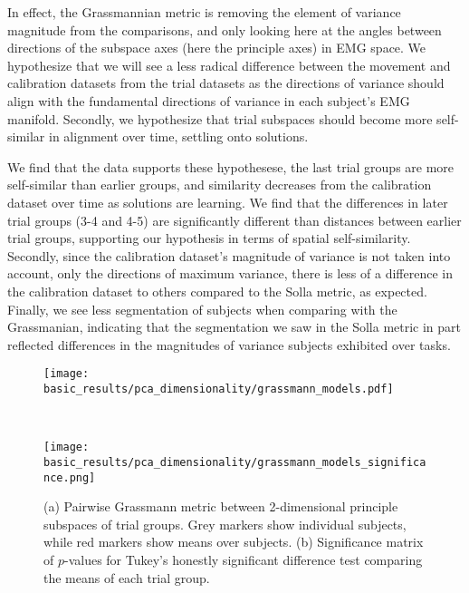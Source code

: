 \documentclass[../main.tex]{subfiles}
\begin{document}
In effect, the Grassmannian metric is removing the element of variance magnitude from the comparisons, and only looking here at the angles between directions of the subspace axes (here the principle axes) in EMG space. We hypothesize that we will see a less radical difference between the movement and calibration datasets from the trial datasets as the directions of variance should align with the fundamental directions of variance in each subject's EMG manifold. Secondly, we hypothesize that trial subspaces should become more self-similar in alignment over time, settling onto solutions.

We find that the data supports these hypothesese, the last trial groups are more self-similar than earlier groups, and similarity decreases from the calibration dataset over time as solutions are learning. We find that the differences in later trial groups (3-4 and 4-5) are significantly different than distances between earlier trial groups, supporting our hypothesis in terms of spatial self-similarity. Secondly, since the calibration dataset's magnitude of variance is not taken into account, only the directions of maximum variance, there is less of a difference in the calibration dataset to others compared to the Solla metric, as expected. Finally, we see less segmentation of subjects when comparing with the Grassmanian, indicating that the segmentation we saw in the Solla metric in part reflected differences in the magnitudes of variance subjects exhibited over tasks. 

\begin{figure}[!htb]
  \centering
  \begin{minipage}{\textwidth}
    \centering
    \texttt{[image: basic\_results/pca\_dimensionality/grassmann\_models.pdf]}
    \subcaption{}
  \end{minipage}\\%
  \begin{minipage}{\textwidth}
    \centering
    \texttt{[image: basic\_results/pca\_dimensionality/grassmann\_models\_significance.png]}
    \subcaption{}
  \end{minipage}
\caption[Pairwise Grassmann metric between principle subspaces]{(a) Pairwise Grassmann metric between 2-dimensional principle subspaces of trial groups. Grey markers show individual subjects, while red markers show means over subjects. (b) Significance matrix of $p$-values for Tukey's honestly significant difference test comparing the means of each trial group.}\label{fig:grassman_models}
\end{figure}
\end{document}
